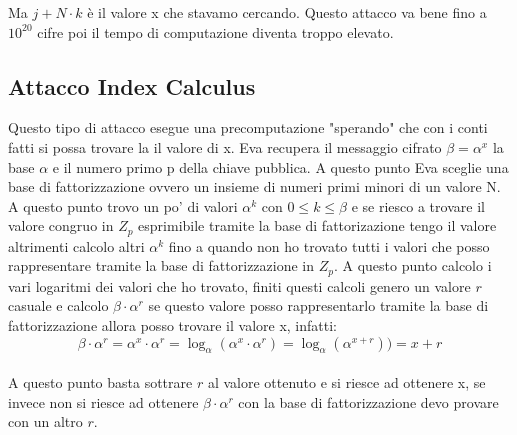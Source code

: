 \documentclass[10pt,a4paper]{article}
\begin{document}
Ma $j+N\cdot k$ è il valore x che stavamo cercando. Questo attacco va bene fino a $10^{20}$ cifre poi il tempo di computazione diventa troppo elevato.

\subsection{Attacco Index Calculus}
Questo tipo di attacco esegue una precomputazione "sperando" che con i conti fatti si possa trovare la il valore di x. Eva recupera il messaggio cifrato $\beta=\alpha^x$ la base $\alpha$ e il numero primo p della chiave pubblica. A questo punto Eva sceglie una base di fattorizzazione ovvero un insieme di numeri primi minori di un valore N. A questo punto trovo un po' di valori $\alpha^k$ con $0\leq k \leq \beta$ e se riesco a trovare il valore congruo in $Z_p$ esprimibile tramite la base di fattorizazione tengo il valore altrimenti calcolo altri $\alpha^k$ fino a quando non ho trovato tutti i valori che posso rappresentare tramite la base di fattorizzazione in $Z_p$. A questo punto calcolo i vari logaritmi dei valori che ho trovato, finiti questi calcoli genero un valore $r$ casuale e calcolo $\beta\cdot\alpha^r$ se questo valore posso rappresentarlo tramite la base di fattorizzazione allora posso trovare il valore x, infatti:
$$ \beta \cdot \alpha^r =
 \alpha^x \cdot \alpha^r = 
 \log_{\alpha}(\alpha^x \cdot \alpha^r) =
  \log_{\alpha}(\alpha^{x+r})) = x+r$$\\

A questo punto basta sottrare $r$ al valore ottenuto e si riesce ad ottenere x, se invece non si riesce ad ottenere $\beta\cdot\alpha^r$ con la base di fattorizzazione devo provare con un altro $r$.
\end{document}
